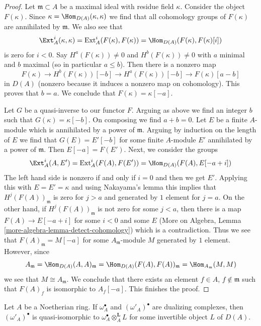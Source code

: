 \begin{proof}
Let $\mathfrak m \subset A$ be a maximal ideal with residue field $\kappa$.
Consider the object $F(\kappa)$. Since
$\kappa = \Hom_{D(A)}(\kappa, \kappa)$ we find that all
cohomology groups of $F(\kappa)$ are annihilated by $\mathfrak m$.
We also see that
$$
\Ext^i_A(\kappa, \kappa) = \text{Ext}^i_A(F(\kappa), F(\kappa))
= \Hom_{D(A)}(F(\kappa), F(\kappa)[i])
$$
is zero for $i < 0$. Say $H^a(F(\kappa)) \not = 0$ and
$H^b(F(\kappa)) \not = 0$ with $a$ minimal and $b$ maximal
(so in particular $a \leq b$). Then there is a nonzero map
$$
F(\kappa) \to H^b(F(\kappa))[-b] \to H^a(F(\kappa))[-b]
\to F(\kappa)[a - b]
$$
in $D(A)$ (nonzero because it induces a nonzero map on cohomology).
This proves that $b = a$. We conclude that $F(\kappa) = \kappa[-a]$.

\medskip\noindent
Let $G$ be a quasi-inverse to our functor $F$. Arguing as above
we find an integer $b$ such that $G(\kappa) = \kappa[-b]$.
On composing we find $a + b = 0$. Let $E$ be a finite $A$-module
which is annihilated by a power of $\mathfrak m$. Arguing by
induction on the length of $E$ we find that $G(E) = E'[-b]$
for some finite $A$-module $E'$ annihilated by a power of
$\mathfrak m$. Then $E[-a] = F(E')$.
Next, we consider the groups
$$
\Ext^i_A(A, E') = \text{Ext}^i_A(F(A), F(E')) =
\Hom_{D(A)}(F(A), E[-a + i])
$$
The left hand side is nonzero if and only if $i = 0$ and then
we get $E'$. Applying this with $E = E' = \kappa$ and using Nakayama's
lemma this implies that $H^j(F(A))_\mathfrak m$ is zero for $j > a$ and
generated by $1$ element for $j = a$. On the other hand, if
$H^j(F(A))_\mathfrak m$ is not zero for some $j < a$, then
there is a map $F(A) \to E[-a + i]$ for some $i < 0$ and some
$E$ (More on Algebra, Lemma \ref{more-algebra-lemma-detect-cohomology})
which is a contradiction.
Thus we see that $F(A)_\mathfrak m = M[-a]$
for some $A_\mathfrak m$-module $M$ generated by $1$ element.
However, since
$$
A_\mathfrak m = \Hom_{D(A)}(A, A)_\mathfrak m =
\Hom_{D(A)}(F(A), F(A))_\mathfrak m = \Hom_{A_\mathfrak m}(M, M)
$$
we see that $M \cong A_\mathfrak m$. We conclude that there exists
an element $f \in A$, $f \not \in \mathfrak m$ such that
$F(A)_f$ is isomorphic to $A_f[-a]$. This finishes the proof.
\end{proof}

\begin{lemma}
\label{lemma-dualizing-unique}
Let $A$ be a Noetherian ring. If $\omega_A^\bullet$ and
$(\omega'_A)^\bullet$ are dualizing complexes, then
$(\omega'_A)^\bullet$ is quasi-isomorphic to
$\omega_A^\bullet \otimes_A^\mathbf{L} L$
for some invertible object $L$ of $D(A)$.
\end{lemma}

